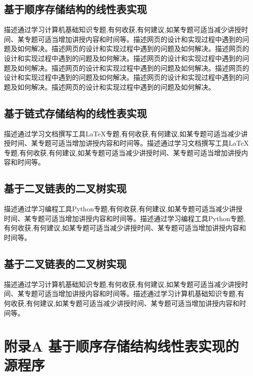 \documentclass[supercite]{Experimental_Report}
\theoremstyle{definition}
\begin{document}
\subsection{基于顺序存储结构的线性表实现}

描述通过学习计算机基础知识专题,有何收获,有何建议,如某专题可适当减少讲授时间、某专题可适当增加讲授内容和时间等。描述网页的设计和实现过程中遇到的问题及如何解决。描述网页的设计和实现过程中遇到的问题及如何解决。描述网页的设计和实现过程中遇到的问题及如何解决。描述网页的设计和实现过程中遇到的问题及如何解决。描述网页的设计和实现过程中遇到的问题及如何解决。描述网页的设计和实现过程中遇到的问题及如何解决。描述网页的设计和实现过程中遇到的问题及如何解决。描述网页的设计和实现过程中遇到的问题及如何解决。

\subsection{基于链式存储结构的线性表实现}

描述通过学习文档撰写工具LaTeX专题,有何收获,有何建议,如某专题可适当减少讲授时间、某专题可适当增加讲授内容和时间等。描述通过学习文档撰写工具LaTeX专题,有何收获,有何建议,如某专题可适当减少讲授时间、某专题可适当增加讲授内容和时间等。

\subsection{基于二叉链表的二叉树实现}

描述通过学习编程工具Python专题,有何收获,有何建议,如某专题可适当减少讲授时间、某专题可适当增加讲授内容和时间等。描述通过学习编程工具Python专题,有何收获,有何建议,如某专题可适当减少讲授时间、某专题可适当增加讲授内容和时间等。

\subsection{基于二叉链表的二叉树实现}

描述通过学习计算机基础知识专题,有何收获,有何建议,如某专题可适当减少讲授时间、某专题可适当增加讲授内容和时间等。描述通过学习计算机基础知识专题,有何收获,有何建议,如某专题可适当减少讲授时间、某专题可适当增加讲授内容和时间等。


\nocite{*} %



\setcounter{secnumdepth}{0}
\appendix

\section{附录A 基于顺序存储结构线性表实现的源程序}
\end{document}
